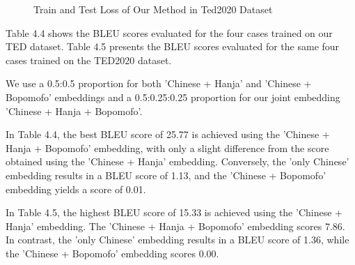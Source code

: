 \documentclass[PhD]{PHlab-thesis}
\begin{document}
\begin{figure}[h!]
  \centering
  \hfill
  \captionsetup{type=figure}
  \caption{Train and Test Loss of Our Method in Ted2020 Dataset}
  \label{fig:naver dictionary}
\end{figure}

Table 4.4 shows the BLEU scores evaluated for the four cases trained on our TED dataset. Table 4.5 presents the BLEU scores evaluated for the same four cases trained on the TED2020 dataset.

We use a 0.5:0.5 proportion for both 'Chinese + Hanja' and 'Chinese + Bopomofo' embeddings and a 0.5:0.25:0.25 proportion for our joint embedding 'Chinese + Hanja + Bopomofo'.

In Table 4.4, the best BLEU score of 25.77 is achieved using the 'Chinese + Hanja + Bopomofo' embedding, with only a slight difference from the score obtained using the 'Chinese + Hanja' embedding. Conversely, the 'only Chinese' embedding results in a BLEU score of 1.13, and the 'Chinese + Bopomofo' embedding yields a score of 0.01.

In Table 4.5, the highest BLEU score of 15.33 is achieved using the 'Chinese + Hanja' embedding. The 'Chinese + Hanja + Bopomofo' embedding scores 7.86. In contrast, the 'only Chinese' embedding results in a BLEU score of 1.36, while the 'Chinese + Bopomofo' embedding scores 0.00.
\end{document}
